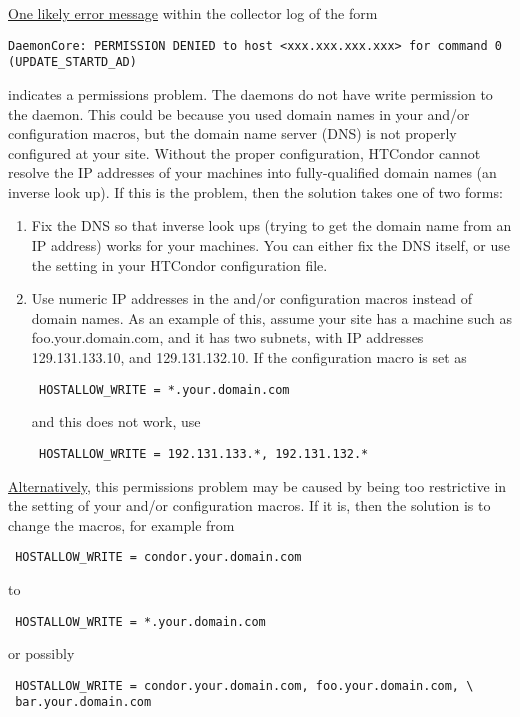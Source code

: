 \underline{One likely error message} within the collector log of the form
\footnotesize
\begin{verbatim}
DaemonCore: PERMISSION DENIED to host <xxx.xxx.xxx.xxx> for command 0 (UPDATE_STARTD_AD)
\end{verbatim}
\normalsize
indicates a permissions problem.
The  daemons do not have write permission to the
 daemon.
This could be because
you used domain names in your  and/or
 configuration macros,
but the domain name server (DNS) is not properly configured at your site.
Without the proper configuration, HTCondor cannot resolve
the IP addresses of your machines
into fully-qualified domain names (an inverse look up).
If this is the problem, then the solution takes one of two forms:
\begin{enumerate}
\item Fix the DNS so that inverse look ups (trying to get the domain name
   from an IP address) works for your machines.  You can
   either fix the DNS itself,
   or use the  setting in your HTCondor
         configuration file.
\item Use numeric IP addresses in the  and/or
    configuration macros
   instead of domain names.
   As an example of this, assume your site has a machine such as
   foo.your.domain.com, and it has two subnets, with IP addresses
   129.131.133.10, and 129.131.132.10.
   If the configuration macro is set as 

\begin{verbatim}
 HOSTALLOW_WRITE = *.your.domain.com
\end{verbatim}

   and this does not work, use

\begin{verbatim}
 HOSTALLOW_WRITE = 192.131.133.*, 192.131.132.*
\end{verbatim}
\end{enumerate}

\underline{Alternatively}, this permissions problem
may be caused by being too restrictive in the setting of
your  and/or
 configuration macros.
If it is, then the solution is to change the macros,
for example from
\begin{verbatim}
 HOSTALLOW_WRITE = condor.your.domain.com
\end{verbatim}
to
\begin{verbatim}
 HOSTALLOW_WRITE = *.your.domain.com
\end{verbatim}
or possibly
\footnotesize
\begin{verbatim}
 HOSTALLOW_WRITE = condor.your.domain.com, foo.your.domain.com, \
 bar.your.domain.com 
\end{verbatim}
\normalsize


